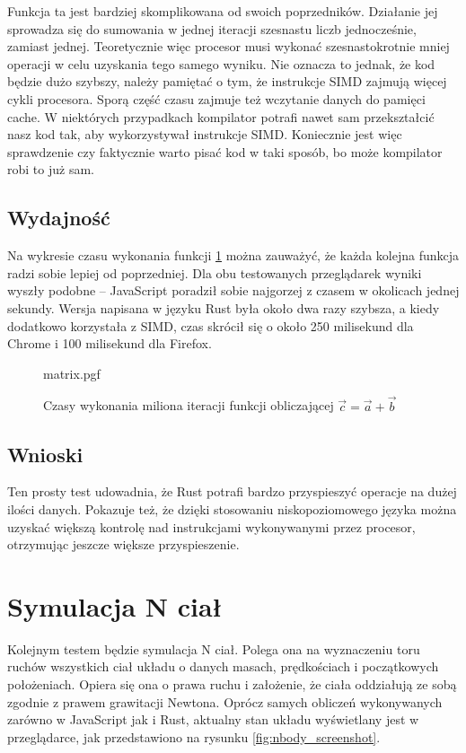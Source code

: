 \documentclass[language=polish,type=master]{aghmodern}
\begin{document}
Funkcja ta jest bardziej skomplikowana od swoich poprzedników.
Działanie jej sprowadza się do sumowania w jednej iteracji szesnastu liczb jednocześnie, zamiast jednej.
Teoretycznie więc procesor musi wykonać szesnastokrotnie mniej operacji w celu uzyskania tego samego wyniku.
Nie oznacza to jednak, że kod będzie dużo szybszy, należy pamiętać o tym, że instrukcje SIMD zajmują więcej cykli procesora.
Sporą część czasu zajmuje też wczytanie danych do pamięci cache.
W niektórych przypadkach kompilator potrafi nawet sam przekształcić nasz kod tak, aby wykorzystywał instrukcje SIMD.
Koniecznie jest więc sprawdzenie czy faktycznie warto pisać kod w taki sposób, bo może kompilator robi to już sam.

\subsection{Wydajność}
Na wykresie czasu wykonania funkcji \ref{fig:matrix} można zauważyć, że każda kolejna funkcja radzi sobie lepiej od poprzedniej.
Dla obu testowanych przeglądarek wyniki wyszły podobne -- JavaScript poradził sobie najgorzej z czasem w okolicach jednej sekundy.
Wersja napisana w języku Rust była około dwa razy szybsza, a kiedy dodatkowo korzystała z SIMD, czas skrócił się o około 250 milisekund dla Chrome i 100 milisekund dla Firefox.

\begin{figure}[H]
    \centering
    {matrix.pgf}
    \caption{Czasy wykonania miliona iteracji funkcji obliczającej $\vec{c} = \vec{a} + \vec{b}$}
    \label{fig:matrix}
\end{figure}

\subsection{Wnioski}
Ten prosty test udowadnia, że Rust potrafi bardzo przyspieszyć operacje na dużej ilości danych.
Pokazuje też, że dzięki stosowaniu niskopoziomowego języka można uzyskać większą kontrolę nad instrukcjami wykonywanymi przez procesor, otrzymując jeszcze większe przyspieszenie.

\section{Symulacja N ciał}
Kolejnym testem będzie symulacja N ciał.
Polega ona na wyznaczeniu toru ruchów wszystkich ciał układu o danych masach, prędkościach i początkowych położeniach.
Opiera się ona o prawa ruchu i założenie, że ciała oddziałują ze sobą zgodnie z prawem grawitacji Newtona.
Oprócz samych obliczeń wykonywanych zarówno w JavaScript jak i Rust, aktualny stan układu wyświetlany jest w przeglądarce, jak przedstawiono na rysunku \ref{fig:nbody_screenshot}. 
\end{document}
